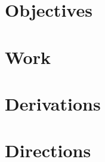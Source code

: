 \documentclass{article}         %
\begin{document}

\section{Objectives}\label{Objectives}



\section{Work}\label{Work}


\section{Derivations}\label{Derivations}



\section{Directions}\label{Directions}
\end{document}
